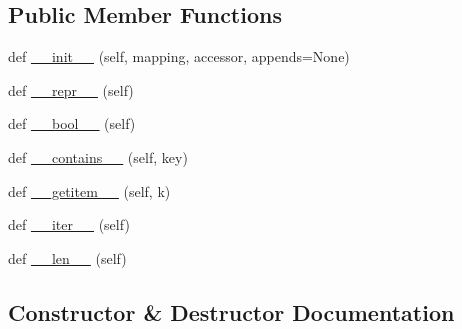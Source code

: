 \subsection*{Public Member Functions}
\begin{DoxyCompactItemize}
\item 
def \hyperlink{classpip_1_1__vendor_1_1resolvelib_1_1structs_1_1IteratorMapping_a6c3109c2175bc9f04e306b1cf8c72591}{\+\_\+\+\_\+init\+\_\+\+\_\+} (self, mapping, accessor, appends=None)
\item 
def \hyperlink{classpip_1_1__vendor_1_1resolvelib_1_1structs_1_1IteratorMapping_a537860d62ab2daa43c5cc3945aee1d9b}{\+\_\+\+\_\+repr\+\_\+\+\_\+} (self)
\item 
def \hyperlink{classpip_1_1__vendor_1_1resolvelib_1_1structs_1_1IteratorMapping_a6bafba1ff56793bb3cc63532e8a6f4bd}{\+\_\+\+\_\+bool\+\_\+\+\_\+} (self)
\item 
def \hyperlink{classpip_1_1__vendor_1_1resolvelib_1_1structs_1_1IteratorMapping_abf96aada2c94cde36d6f1ba51db3868a}{\+\_\+\+\_\+contains\+\_\+\+\_\+} (self, key)
\item 
def \hyperlink{classpip_1_1__vendor_1_1resolvelib_1_1structs_1_1IteratorMapping_ac5450e7041fbe599eae71c000dd4f3e7}{\+\_\+\+\_\+getitem\+\_\+\+\_\+} (self, k)
\item 
def \hyperlink{classpip_1_1__vendor_1_1resolvelib_1_1structs_1_1IteratorMapping_a6306df929441026648be47325ed57cf9}{\+\_\+\+\_\+iter\+\_\+\+\_\+} (self)
\item 
def \hyperlink{classpip_1_1__vendor_1_1resolvelib_1_1structs_1_1IteratorMapping_a4af85811fc0a6f2cd5dca3dd3253bec3}{\+\_\+\+\_\+len\+\_\+\+\_\+} (self)
\end{DoxyCompactItemize}


\subsection{Constructor \& Destructor Documentation}
\mbox{\label{classpip_1_1__vendor_1_1resolvelib_1_1structs_1_1IteratorMapping_a6c3109c2175bc9f04e306b1cf8c72591}} 
